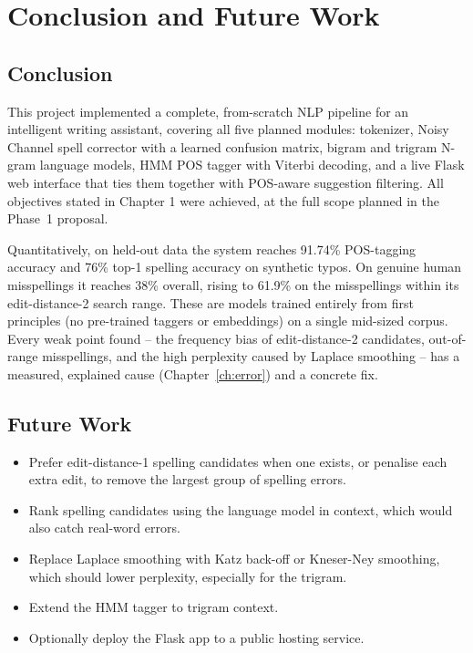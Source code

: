 \documentclass[12pt,a4paper]{report}
\begin{document}
\chapter{Conclusion and Future Work}
\label{ch:conclusion}

\section{Conclusion}

This project implemented a complete, from-scratch NLP pipeline for an
intelligent writing assistant, covering all five planned modules:
tokenizer, Noisy Channel spell corrector with a learned confusion matrix,
bigram and trigram N-gram language models, HMM POS tagger with Viterbi
decoding, and a live Flask web interface that ties them together with
POS-aware suggestion filtering. All objectives stated in Chapter 1 were
achieved, at the full scope planned in the Phase~1 proposal.

Quantitatively, on held-out data the system reaches 91.74\% POS-tagging
accuracy and 76\% top-1 spelling accuracy on synthetic typos. On genuine
human misspellings it reaches 38\% overall, rising to 61.9\% on the
misspellings within its edit-distance-2 search range. These are models
trained entirely from first principles (no pre-trained taggers or
embeddings) on a single mid-sized corpus. Every weak point found -- the
frequency bias of edit-distance-2 candidates, out-of-range misspellings,
and the high perplexity caused by Laplace smoothing -- has a measured,
explained cause (Chapter~\ref{ch:error}) and a concrete fix.

\section{Future Work}

\begin{itemize}
    \item Prefer edit-distance-1 spelling candidates when one exists, or
    penalise each extra edit, to remove the largest group of spelling
    errors.
    \item Rank spelling candidates using the language model in context,
    which would also catch real-word errors.
    \item Replace Laplace smoothing with Katz back-off or Kneser-Ney
    smoothing, which should lower perplexity, especially for the trigram.
    \item Extend the HMM tagger to trigram context.
    \item Optionally deploy the Flask app to a public hosting service.
\end{itemize}
\end{document}
